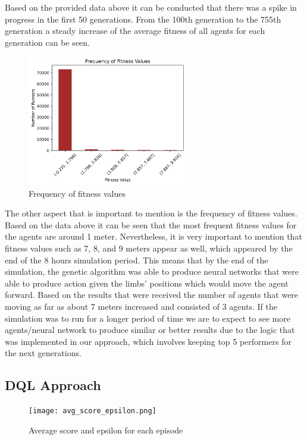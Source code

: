 \documentclass[letterpaper]{article} %
\begin{document}
\par Based on the provided data above it can be conducted that there was a spike in progress in the first 50 generations. From the 100th generation to the 755th generation a steady increase of the average fitness of all agents for each generation can be seen. 

\begin{figure}[h]
\caption{Frequency of fitness values}
\centering
\includegraphics[width=7cm]{fitness_frequency.png}
\end{figure}

\par The other aspect that is important to mention is the frequency of fitness values. Based on the data above it can be seen that the most frequent fitness values for the agents are around 1 meter. Nevertheless, it is very important to mention that fitness values such as 7, 8, and 9 meters appear as well, which appeared by the end of the 8 hours simulation period. This means that by the end of the simulation, the genetic algorithm was able to produce neural networks that were able to produce action given the limbs' positions which would move the agent forward. Based on the results that were received the number of agents that were moving as far as about 7 meters increased and consisted of 3 agents. If the simulation was to run for a longer period of time we are to expect to see more agents/neural network to produce similar or better results due to the logic that was implemented in our approach, which involves keeping top 5 performers for the next generations. 

\subsection{DQL Approach}

\begin{figure}[h]
\caption{Average score and epsilon for each episode}
\centering
\texttt{[image: avg\_score\_epsilon.png]}
\end{figure}
\end{document}
